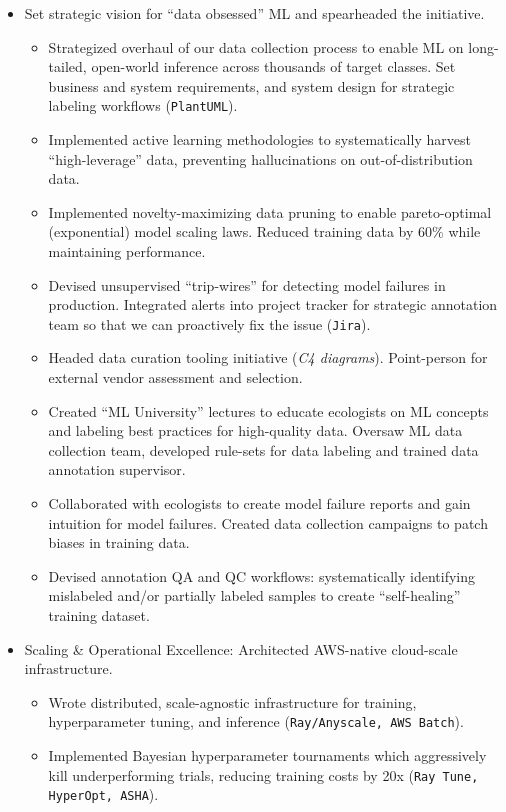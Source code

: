 \documentclass[a4paper,12pt]{article}
\begin{document}
\begin{itemize}
        \item Set strategic vision for ``data obsessed'' ML and spearheaded the initiative.
        \begin{itemize}
            \item Strategized overhaul of our data collection process to enable ML on long-tailed, open-world inference across thousands of target classes. Set business and system requirements, and system design for strategic labeling workflows (\texttt{PlantUML}).
            \item Implemented active learning methodologies to systematically harvest ``high-leverage'' data, preventing hallucinations on out-of-distribution data.
            \item Implemented novelty-maximizing data pruning to enable pareto-optimal (exponential) model scaling laws. Reduced training data by 60\% while maintaining performance.
            \item Devised unsupervised ``trip-wires'' for detecting model failures in production. Integrated alerts into project tracker for strategic annotation team so that we can proactively fix the issue (\texttt{Jira}).
            \item Headed data curation tooling initiative (\textit{C4 diagrams}). Point-person for external vendor assessment and selection.
            \item Created ``ML University'' lectures to educate ecologists on ML concepts and labeling best practices for high-quality data. Oversaw ML data collection team, developed rule-sets for data labeling and trained data annotation supervisor.
            \item Collaborated with ecologists to create model failure reports and gain intuition for model failures. Created data collection campaigns to patch biases in training data.
            \item Devised annotation QA and QC workflows: systematically identifying mislabeled and/or partially labeled samples to create ``self-healing'' training dataset.
        \end{itemize}
        \item Scaling \& Operational Excellence: Architected AWS-native cloud-scale infrastructure.
        \begin{itemize}
            \item Wrote distributed, scale-agnostic infrastructure for training, hyperparameter tuning, and inference (\texttt{Ray/Anyscale, AWS Batch}).
            \item Implemented Bayesian hyperparameter tournaments which aggressively kill underperforming trials, reducing training costs by 20x (\texttt{Ray Tune, HyperOpt, ASHA}).

\end{itemize}
\end{itemize}
\end{document}
